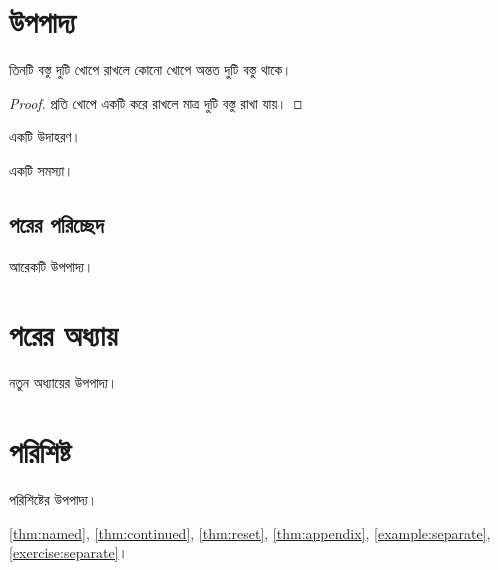 \documentclass[oneside,openany]{bookbangla}
\begin{document}
\mainmatter
\chapter{উপপাদ্য}
\begin{theorem}[পায়রার খোপ নীতি]\label{thm:named}
তিনটি বস্তু দুটি খোপে রাখলে কোনো খোপে অন্তত দুটি বস্তু থাকে।
\end{theorem}
\begin{proof}প্রতি খোপে একটি করে রাখলে মাত্র দুটি বস্তু রাখা যায়।\end{proof}
\begin{example}\label{example:separate}একটি উদাহরণ।\end{example}
\begin{exercise}\label{exercise:separate}একটি সমস্যা।\end{exercise}
\section{পরের পরিচ্ছেদ}
\begin{theorem}\label{thm:continued}আরেকটি উপপাদ্য।\end{theorem}
\chapter{পরের অধ্যায়}
\begin{theorem}\label{thm:reset}নতুন অধ্যায়ের উপপাদ্য।\end{theorem}
\appendix
\chapter{পরিশিষ্ট}
\begin{theorem}\label{thm:appendix}পরিশিষ্টের উপপাদ্য।\end{theorem}
\autoref{thm:named}, \autoref{thm:continued}, \autoref{thm:reset},
\autoref{thm:appendix}, \autoref{example:separate}, \autoref{exercise:separate}।
\end{document}
